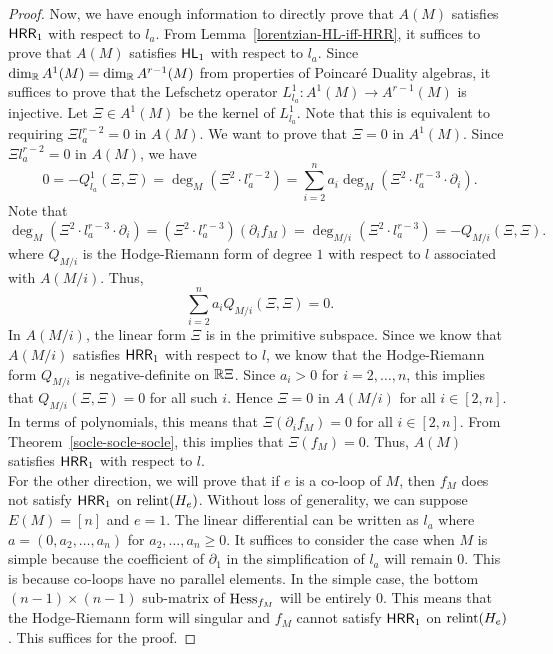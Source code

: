 \documentclass{puthesis-UG}
\begin{document}
\begin{proof}
	Now, we have enough information to directly prove that $A(M)$ satisfies $\mathsf{HRR}_1$ with respect to $l_a$. From Lemma~\ref{lorentzian-HL-iff-HRR}, it suffices to prove that $A(M)$ satisfies $\mathsf{HL}_1$ with respect to $l_a$. Since $\dim_{\mathbb{R}} A^1(M) = \dim_{\mathbb{R}} A^{r-1}(M)$ from properties of Poincar\'e Duality algebras, it suffices to prove that the Lefschetz operator $L_{l_a}^1 : A^1(M) \to A^{r-1}(M)$ is injective. Let $\Xi \in A^1(M)$ be the kernel of $L_{l_a}^1$. Note that this is equivalent to requiring $\Xi l_a^{r-2} = 0$ in $A(M)$. We want to prove that $\Xi = 0$ in $A^1(M)$. Since $\Xi l_a^{r-2} = 0$ in $A(M)$, we have 
	\[
		0 = -Q_{l_a}^1 (\Xi, \Xi) = \deg_M (\Xi^2 \cdot l_a^{r-2}) = \sum_{i = 2}^n a_i \deg_M (\Xi^2 \cdot l_a^{r-3} \cdot \partial_i).
	\]
	Note that 
	\[
		\deg_M (\Xi^2 \cdot l_a^{r-3} \cdot \partial_i) = (\Xi^2 \cdot l_a^{r-3}) (\partial_i f_M) = \deg_{M / i} (\Xi^2 \cdot l_a^{r-3}) = - Q_{M/i} (\Xi, \Xi).
	\]
	where $Q_{M/i}$ is the Hodge-Riemann form of degree $1$ with respect to $l$ associated with $A(M/i)$. Thus, 
	\[
		\sum_{i = 2}^n a_i Q_{M/i}(\Xi, \Xi) = 0.
	\]
	In $A(M/i)$, the linear form $\Xi$ is in the primitive subspace. Since we know that $A(M/i)$ satisfies $\mathsf{HRR}_1$ with respect to $l$, we know that the Hodge-Riemann form $Q_{M/i}$ is negative-definite on $\mathbb{R} \Xi$. Since $a_i > 0$ for $i = 2, \ldots, n$, this implies that $Q_{M/i}(\Xi, \Xi) = 0$ for all such $i$. Hence $\Xi = 0$ in $A(M/i)$ for all $i \in [2, n]$. In terms of polynomials, this means that $\Xi (\partial_i f_M) = 0$ for all $i \in [2, n]$. From Theorem~\ref{socle-socle-socle}, this implies that $\Xi (f_M) = 0$. Thus, $A(M)$ satisfies $\mathsf{HRR}_1$ with respect to $l$. \\

	For the other direction, we will prove that if $e$ is a co-loop of $M$, then $f_M$ does not satisfy $\mathsf{HRR}_1$ on $\operatorname{relint} (H_e)$. Without loss of generality, we can suppose $E(M) = [n]$ and $e = 1$. The linear differential can be written as $l_a$ where $a = (0, a_2, \ldots, a_n)$ for $a_2, \ldots, a_n \geq 0$. It suffices to consider the case when $M$ is simple because the coefficient of $\partial_1$ in the simplification of $l_a$ will remain $0$. This is because co-loops have no parallel elements. In the simple case, the bottom $(n-1) \times (n-1)$ sub-matrix of $\operatorname{Hess}_{f_M}$ will be entirely $0$. This means that the Hodge-Riemann form will singular and $f_M$ cannot satisfy $\mathsf{HRR}_1$ on $\operatorname{relint} (H_e)$. This suffices for the proof. 
\end{proof}
\end{document}
